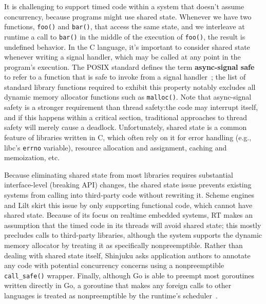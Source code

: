 It is challenging to support timed code within a system that doesn't assume
concurrency, because programs might use shared state.  Whenever we have two
functions,
\texttt{foo()} and \texttt{bar()}, that access the same state, and we interleave at
runtime a call to \texttt{bar()} in the middle of the execution of \texttt{foo()},
the result is undefined behavior.  In the C language, it's important to consider
shared state whenever writing a signal handler, which may be called at any point
in the program's execution.  The POSIX standard defines the term \textbf{async-signal
safe} to
refer to a function that is safe to invoke from a signal
handler~\cite{signal-safety-manpage}; the list of standard library functions required
to exhibit this property notably excludes all dynamic memory allocator functions such
as \texttt{malloc()}.  Note that async-signal safety is a stronger requirement than
thread safety:\@ the code may interrupt itself, and if this happens within a critical
section, traditional approaches to thread safety will merely cause a deadlock.
Unfortunately, shared state is a common feature of libraries written in C, which
often rely on it for error handling (e.g., libc's \texttt{errno} variable), resource
allocation and assignment, caching and memoization, etc.

Because eliminating shared state from most libraries requires substantial
interface-level (breaking API) changes, the shared state issue prevents existing
systems from calling into third-party code without rewriting it.  Scheme engines and
Lilt skirt this issue by only supporting functional code, which cannot have shared
state.  Because of its focus on realtime embedded systems, RT makes an assumption
that the timed code in its threads will avoid shared state; this mostly precludes
calls to third-party libraries, although the system supports the dynamic memory
allocator by treating it as specifically nonpreemptible.  Rather than dealing with
shared state itself, Shinjuku asks application authors to annotate any code with
potential concurrency concerns using a nonpreemptible \texttt{call\_safe()} wrapper.
Finally, although Go is able to preempt most goroutines written directly in Go, a
goroutine that makes any foreign calls to other languages is treated as
nonpreemptible by the runtime's scheduler~\cite{www-golang-fficall}.

